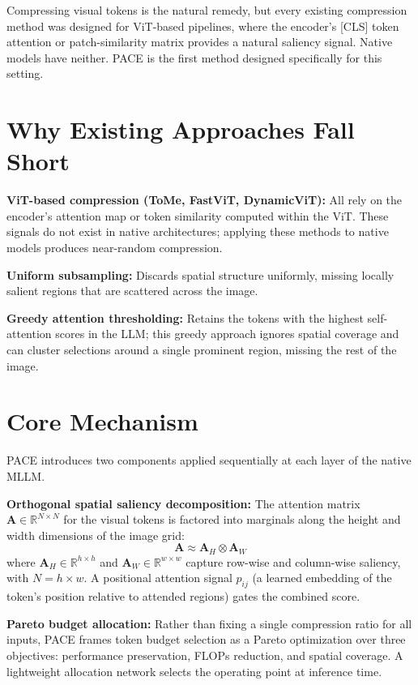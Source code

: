 \documentclass[10pt,twocolumn]{article}
\begin{document}
Compressing visual tokens is the natural remedy, but every existing compression
method was designed for ViT-based pipelines, where the encoder's [CLS]
token attention or patch-similarity matrix provides a natural saliency signal.
Native models have neither. PACE is the first method designed specifically
for this setting.

\section{Why Existing Approaches Fall Short}

\textbf{ViT-based compression (ToMe, FastViT, DynamicViT):} All rely on
the encoder's attention map or token similarity computed within the ViT.
These signals do not exist in native architectures; applying these methods
to native models produces near-random compression.

\textbf{Uniform subsampling:} Discards spatial structure uniformly, missing
locally salient regions that are scattered across the image.

\textbf{Greedy attention thresholding:} Retains the tokens with the highest
self-attention scores in the LLM; this greedy approach ignores spatial
coverage and can cluster selections around a single prominent region, missing
the rest of the image.

\section{Core Mechanism}

PACE introduces two components applied sequentially at each layer of the
native MLLM.

\textbf{Orthogonal spatial saliency decomposition:} The attention matrix
$\mathbf{A} \in \mathbb{R}^{N \times N}$ for the visual tokens is factored
into marginals along the height and width dimensions of the image grid:
\[
\mathbf{A} \approx \mathbf{A}_H \otimes \mathbf{A}_W
\]
where $\mathbf{A}_H \in \mathbb{R}^{h \times h}$ and
$\mathbf{A}_W \in \mathbb{R}^{w \times w}$ capture row-wise and column-wise
saliency, with $N = h \times w$. A positional attention signal $p_{ij}$ (a
learned embedding of the token's position relative to attended regions)
gates the combined score.

\textbf{Pareto budget allocation:} Rather than fixing a single compression
ratio for all inputs, PACE frames token budget selection as a Pareto
optimization over three objectives: performance preservation, FLOPs reduction,
and spatial coverage. A lightweight allocation network selects the operating
point at inference time.
\end{document}
